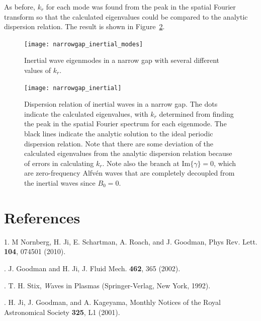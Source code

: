 \documentclass[letterpaper]{article}
\begin{document}
As before, $k_r$ for each mode was found from the peak in the spatial
Fourier transform so that the calculated eigenvalues could be compared
to the analytic dispersion relation. The result is shown in
Figure~\ref{fig:globalcode:narrowgap_inertial}.

\begin{figure}
\centering
\texttt{[image: narrowgap\_inertial\_modes]}
\caption[Inertial wave eigenmodes in a narrow gap]{Inertial wave
  eigenmodes in a narrow gap with several different values of
  $k_r$.}
\label{fig:globalcode:narrowgap_inertial_modes}
\end{figure}


\begin{figure}
\centering
\texttt{[image: narrowgap\_inertial]}
\caption[Dispersion relation of inertial waves in a narrow
  gap]{Dispersion relation of inertial waves in a narrow gap. The dots
  indicate the calculated eigenvalues, with $k_r$ determined from
  finding the peak in the spatial Fourier spectrum for each
  eigenmode. The black lines indicate the analytic solution to the
  ideal periodic dispersion relation. Note that there are some
  deviation of the calculated eigenvalues from the analytic dispersion
  relation because of errors in calculating $k_r$. Note also the
  branch at $\mathrm{Im}\{\gamma\}=0$, which are zero-frequency
  Alfv\'en waves that are completely decoupled from the inertial waves
  since $B_0=0$.}
\label{fig:globalcode:narrowgap_inertial}
\end{figure}



\section{References}
1. M Nornberg, H. Ji, E. Schartman, A. Roach, and J. Goodman, Phys
Rev. Lett. {\bf 104}, 074501 (2010).

. J. Goodman and H. Ji, J. Fluid Mech. {\bf 462}, 365 (2002).

. T. H. Stix, {\emph Waves in Plasmas} (Springer-Verlag,
New York, 1992).

. H. Ji, J. Goodman, and A. Kageyama, Monthly Notices of
the Royal Astronomical Society {\bf 325}, L1 (2001).
\end{document}
